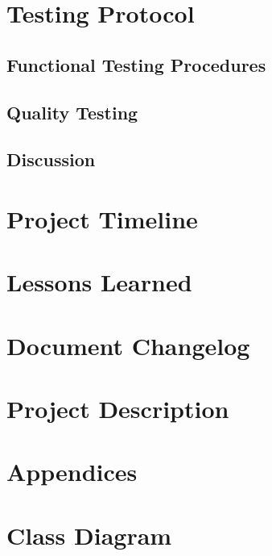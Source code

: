 \documentclass{article}
\begin{document}
	\section{Testing Protocol}
	\subsection{Functional Testing Procedures}
	
	
	\subsection{Quality Testing}
	
	
	\subsection{Discussion}
	
	\pagebreak
	

	
	\section{Project Timeline}
	
	\pagebreak
	
	\section{Lessons Learned}
	
	\pagebreak
	
	\section{Document Changelog}
	
	\pagebreak
	
	\section{Project Description}
	
	\pagebreak
	
	\appendix
	\section*{Appendices}
	\section{Class Diagram}
\end{document}
